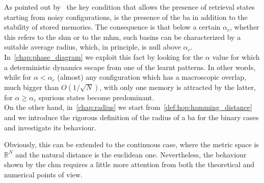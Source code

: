 \documentclass[\rootdir/main.tex]{subfiles}
\begin{document}
As pointed out by~\textcite{Kanter} the key condition that allows the presence of retrieval states starting from noisy configurations, is the presence of the \acrlong{ba} in addition to the stability of stored memories. The consequence is that below a certain $\alpha_c$, whether this refers to the \acrlong{shm} or to the \acrlong{mhm}, such basins can be characterized by a suitable average radius, which, in principle, is null above $\alpha_c$. In~\cref{chap:phase_diagram} we exploit this fact by looking for the $\alpha$ value for which a deterministic dynamics escape from one of the learnt patterns. In other words, while for $\alpha < \alpha_c$ (almost) any configuration which has a macroscopic overlap, \ie much bigger than $O\left(1/\sqrt{N} \right)$, with only one memory is attracted by the latter, for $\alpha \geq \alpha_c$ spurious states become predominant.\\
On the other hand, in~\cref{chap:radius} we start from~\cref{def:hop:hamming_distance} and we introduce the rigorous definition of the radius of a \acrlong{ba} for the binary cases and investigate its behaviour.

Obviously, this can be extended to the continuous case, where the metric space is $\mathbb{R}^N$ and the natural distance is the euclidean one. Nevertheless, the behaviour shown by the \acrlong{chm} requires a little more attention from both the theoretical and numerical points of view.
\subbibliography
\end{document}
